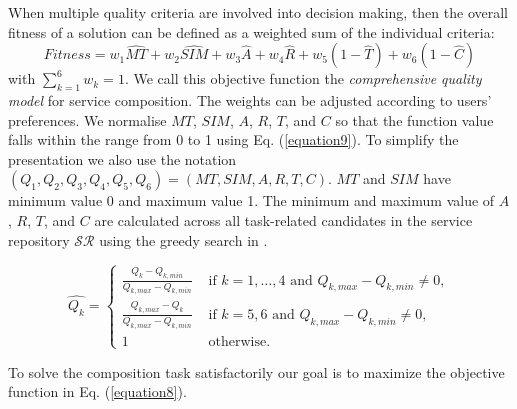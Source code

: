 \documentclass{llncs}
\begin{document}
\vspace{-0.1cm}
\noindent When multiple quality criteria are involved into decision making, then the overall fitness of a solution can be defined as a weighted sum of the individual criteria: 
\vspace{-0.2cm}
\begin{equation}
\label{equation8}
Fitness = w_1 \hat{MT} + w_2 \hat{SIM} + w_3 \hat{A} + w_4 \hat{R} + w_5(1 - \hat{T}) + w_6(1 - \hat{C})
\end{equation}
\noindent with $\sum_{k=1}^{6} w_k= 1$. We call this objective function the \emph{comprehensive quality model} for service composition.
The weights can be adjusted according to users' preferences. We normalise $MT$, $SIM$, $A$, $R$, $T$, and $C$ so that the function value falls within the range from 0 to 1 using Eq. (\ref{equation9}). To simplify the presentation we also use the notation $(Q_1,Q_2,Q_3,Q_4,Q_5,Q_6) = (MT,SIM,A,R,T,C)$. $MT$ and $SIM$ have minimum value 0 and maximum value 1. The minimum and maximum value of $A$, $R$, $T$, and $C$ are calculated across all task-related candidates in the service repository $\mathcal{SR}$ using the greedy search in \cite{ma2015hybrid,da2016genetic}.

\begin{equation}
\label{equation9}
\hat{Q_k} = 
\begin{cases}
	\frac{Q_k - Q_{k, min}}{Q_{k, max} - Q_{k, min}} & \text{ if $k=1,\ldots,4$ and }Q_{k, max} - Q_{k, min} \neq 0,\\
	\frac{Q_{k,max} - Q_k}{Q_{k, max} - Q_{k, min}} & \text{ if $k=5,6$ and }Q_{k, max} - Q_{k, min} \neq 0,\\
	1 & \text{ otherwise}.
\end{cases}
\end{equation}

\noindent To solve the composition task satisfactorily our goal is to maximize the objective function in Eq. (\ref{equation8}).
\end{document}
